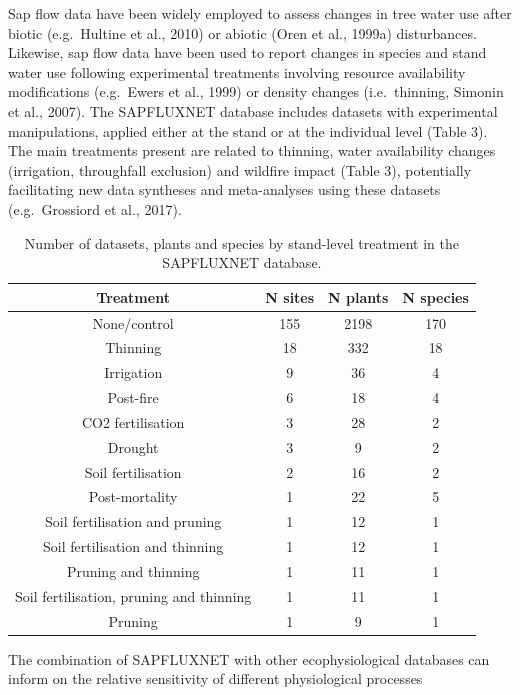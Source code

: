 \documentclass[11pt,twoside]{reedthesis}
\begin{document}
Sap flow data have been widely employed to assess changes in tree water
use after biotic (e.g.~Hultine et al., 2010) or abiotic (Oren et al.,
1999a) disturbances. Likewise, sap flow data have been used to report
changes in species and stand water use following experimental treatments
involving resource availability modifications (e.g.~Ewers et al., 1999)
or density changes (i.e.~thinning, Simonin et al., 2007). The SAPFLUXNET
database includes datasets with experimental manipulations, applied
either at the stand or at the individual level (Table 3). The main
treatments present are related to thinning, water availability changes
(irrigation, throughfall exclusion) and wildfire impact (Table 3),
potentially facilitating new data syntheses and meta-analyses using
these datasets (e.g.~Grossiord et al., 2017).\par
\begin{table}[!h]

\caption[Number of datasets, plants and species by stand-level treatment in the SAPFLUXNET database.]{\label{tab:Ch3T3}Number of datasets, plants and species by stand-level treatment in the SAPFLUXNET database.}
\centering
\fontsize{10}{12}\selectfont
\begin{tabular}[t]{cccc}
\toprule
Treatment & N sites & N plants & N species\\
\midrule
None/control & 155 & 2198 & 170\\
Thinning & 18 & 332 & 18\\
Irrigation & 9 & 36 & 4\\
Post-fire & 6 & 18 & 4\\
CO2 fertilisation & 3 & 28 & 2\\
Drought & 3 & 9 & 2\\
Soil fertilisation & 2 & 16 & 2\\
Post-mortality & 1 & 22 & 5\\
Soil fertilisation and pruning & 1 & 12 & 1\\
Soil fertilisation and thinning & 1 & 12 & 1\\
Pruning and thinning & 1 & 11 & 1\\
Soil fertilisation, pruning and thinning & 1 & 11 & 1\\
Pruning & 1 & 9 & 1\\
\bottomrule
\end{tabular}
\end{table}
The combination of SAPFLUXNET with other ecophysiological databases can
inform on the relative sensitivity of different physiological processes
\end{document}
